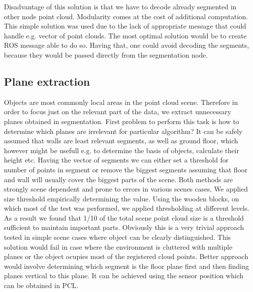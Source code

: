 \documentclass[fontsize=12pt]{article}
\begin{document}
Disadvantage of this solution is that we have to decode already segmented in other node point cloud. Modularity comes at the cost of additional computation. This simple solution was used due to the lack of appropriate message that could handle e.g. vector of point clouds. The most optimal solution would be to create ROS message able to do so. Having that, one could avoid decoding the segments, because they would be passed directly from the segmentation node.

\subsection{Plane extraction}
Objects are most commonly local areas in the point cloud scene. Therefore in order to focus just on the relevant part of the data, we extract unnecessary planes obtained in segmentation. First problem to perform this task is how to determine which planes are irrelevant for particular algorithm? It can be safely assumed that walls are least relevant segments, as well as ground floor, which however might be usefull e.g. to determine the basis of objects, calculate their height etc.
\newline
\indent Having the vector of segments we can either set a threshold for number of points in segment or remove the biggest segments assuming that floor and wall will usually cover the biggest parts of the scene. Both methods are strongly scene dependent and prone to errors in various scenes cases. We applied size threshold empirically determining the value. Using the wooden blocks, on which most of the test was performed, we applied thresholding at different levels. As a result we found that 1/10 of the total scene point cloud size is a	 threshold sufficient to maintain important parts.
\newline
\indent Obviously this is a very trivial approach tested in simple scene cases where object can be clearly distinguished. This solution would fail in case where the environment is cluttered with multiple planes or the object ocupies most of the registered cloud points. Better approach would involve determining which segment is the floor plane first and then finding planes vertical to this plane. It can be achieved using the sensor position which can be obtained in PCL. 
\end{document}
